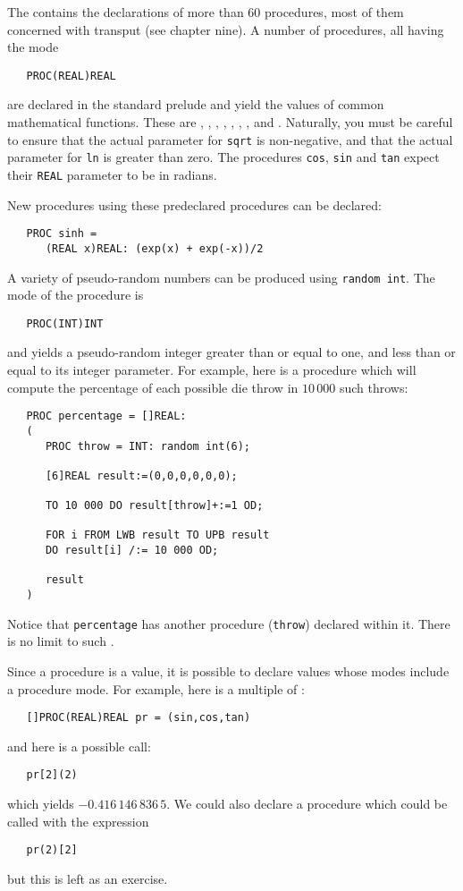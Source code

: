 The  contains the declarations of more than 60
procedures, most of them concerned with transput (see chapter nine).
A number of procedures, all having the mode
\begin{verbatim}
   PROC(REAL)REAL
\end{verbatim}
\noindent
are declared in the standard prelude and yield the values of common
mathematical functions. These are , , ,
, , , ,  and
.  Naturally, you must be careful to ensure that the
actual parameter for \verb|sqrt| is non-negative, and that the actual
parameter for \verb|ln| is greater than zero.  The procedures
\verb|cos|, \verb|sin| and \verb|tan| expect their \verb|REAL|
parameter to be in radians.

New procedures using these predeclared procedures can be declared:
\begin{verbatim}
   PROC sinh =
      (REAL x)REAL: (exp(x) + exp(-x))/2
\end{verbatim}
\noindent
A variety of pseudo-random numbers can be produced using
\verb|random int|. The mode of the procedure  is
\begin{verbatim}
   PROC(INT)INT
\end{verbatim}
\noindent
and yields a pseudo-random integer greater than or equal to one, and
less than or equal to its integer parameter.  For example, here is a
procedure which will compute the percentage of each possible die
throw in $10\,000$ such throws:
\begin{verbatim}
   PROC percentage = []REAL:
   (
      PROC throw = INT: random int(6);

      [6]REAL result:=(0,0,0,0,0,0);

      TO 10 000 DO result[throw]+:=1 OD;

      FOR i FROM LWB result TO UPB result
      DO result[i] /:= 10 000 OD;

      result
   )
\end{verbatim}
\noindent
Notice that \verb|percentage| has another procedure (\verb|throw|)
declared within it. There is no limit to such
. 

Since a procedure is a value, it is possible to declare values whose
modes include a procedure mode. For example, here is a
multiple of :
\begin{verbatim}
   []PROC(REAL)REAL pr = (sin,cos,tan)
\end{verbatim}
\noindent
and here is a possible call:
\begin{verbatim}
   pr[2](2)
\end{verbatim}
\noindent
which yields $-0.416\,146\,836\,5$. We could also declare a procedure
which could be called with the expression
\begin{verbatim}
   pr(2)[2]
\end{verbatim}
\noindent
but this is left as an exercise.

